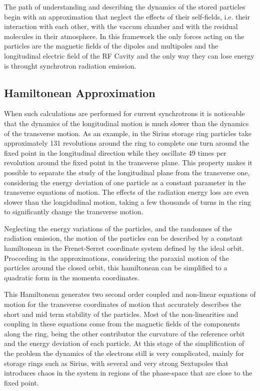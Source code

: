     The path of understanding and describing the dynamics of the stored particles begin with an approximation that neglect the effects of their self-fields, i.e. their interaction with each other, with the vaccum chamber and with the residual molecules in their atmosphere. In this framework the only forces acting on the particles are the magnetic fields of the dipoles and multipoles and the longitudinal electric field of the RF Cavity and the only way they can lose energy is throught synchrotron radiation emission.

\subsection{Hamiltonean Approximation}

    When such calculations are performed for current synchrotrons it is noticeable that the dynamics of the longitudinal motion is much slower than the dynamics of the transverse motion. As an example, in the Sirius storage ring particles take approximately 131 revolutions around the ring to complete one turn around the fixed point in the longitudinal direction while they oscillate 49 times per revolution around the fixed point in the transverse plane. This property makes it possible to separate the study of the longitudinal plane from the transverse one, considering the energy deviation of one particle as a constant parameter in the transverse equations of motion. The effects of the radiation energy loss are even slower than the longidudinal motion, taking a few thousands of turns in the ring to significantly change the transverse motion.

    Neglecting the energy variations of the particles, and the randonnes of the radiation emission, the motion of the particles can be described by a constant hamiltonean in the Frenet-Serret coordinate system defined by the ideal orbit. Procceding in the approximations, considering the paraxial motion of the particles around the closed orbit, this hamiltonean can be simplified to a quadratic form in the momenta coordinates.

    This Hamiltonean generates two second order coupled and non-linear equations of motion for the transverse coordinates of motion that accurately describes the short and mid term stability of the particles. Most of the non-linearities and coupling in these equations come from the magnetic fields of the components along the ring, being the other contributor the curvature of the reference orbit and the energy deviation of each particle. At this stage of the simplification of the problem the dynamics of the electrons still is very complicated, mainly for storage rings such as Sirius, with several and very strong Sextupoles that introduces chaos in the system in regions of the phase-space that are close to the fixed point.

